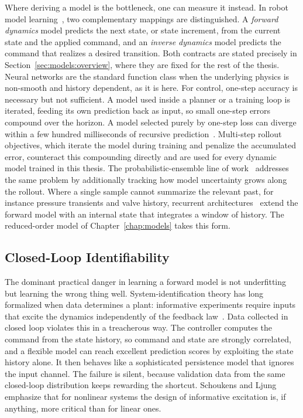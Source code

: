Where deriving a model is the bottleneck, one can measure it instead. In
robot model learning~\cite{nguyentuong2011model}, two complementary
mappings are distinguished. A \emph{forward dynamics} model predicts the next state, or state
increment, from the current state and the applied command, and an
\emph{inverse dynamics} model predicts the command that realizes a desired
transition. Both contracts are stated precisely in
Section~\ref{sec:models:overview}, where they are fixed for the rest of the
thesis.
Neural networks are the standard function class when the underlying
physics is non-smooth and history dependent, as it is here. For control, one-step accuracy is necessary but not sufficient. A model used inside a planner or a training loop is iterated, feeding its
own prediction back as input, so small one-step errors compound over the
horizon. A model selected purely by one-step loss can diverge within a few
hundred milliseconds of recursive prediction~\cite{nagabandi2018neural}.
Multi-step rollout objectives, which iterate the model during training and
penalize the accumulated error, counteract this compounding directly and
are used for every dynamic model trained in this thesis. The
probabilistic-ensemble line of work~\cite{chua2018deep} addresses the
same problem by additionally tracking how model uncertainty grows along
the rollout. Where a single sample cannot summarize the relevant past,
for instance pressure transients and valve history, recurrent
architectures~\cite{hochreiter1997long,cho2014learning} extend
the forward model with an internal state that integrates a window of
history. The reduced-order model of Chapter~\ref{chap:models} takes this
form.

\subsection{Closed-Loop Identifiability}
\label{sec:fund:identifiability}

The dominant practical danger in learning a forward model is not
underfitting but learning the wrong thing well. System-identification
theory has long formalized when data determines a plant: informative
experiments require inputs that excite the dynamics independently of the
feedback law~\cite{ljung1999system,isermann2011identification}. Data
collected in closed loop violates this in a treacherous way. The
controller computes the command from the state history, so command and
state are strongly correlated, and a flexible model can reach excellent
prediction scores by exploiting the state history alone. It then behaves
like a sophisticated persistence model that ignores the input channel.
The failure is silent, because validation data from the same closed-loop
distribution keeps rewarding the shortcut. Schoukens and
Ljung~\cite{schoukens2019nonlinear} emphasize that for nonlinear systems
the design of informative excitation is, if anything, more critical than
for linear ones.

